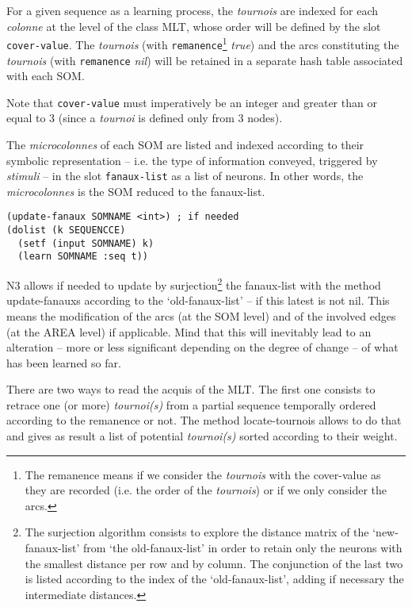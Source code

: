 For a given sequence as a learning process, the \textit{tournois} are indexed for each \textit{colonne} at the level of the class MLT, whose order will be defined by the slot \texttt{cover-value}. The \textit{tournois} (with \texttt{remanence}\footnote{The remanence means if we consider the \textit{tournois} with the cover-value as they are recorded (i.e. the order of the \textit{tournois}) or if we only consider the arcs.} \textit{true}) and the arcs constituting the \textit{tournois} (with \texttt{remanence} \textit{nil}) will be retained in a separate hash table associated with each SOM.

Note that \texttt{cover-value} must imperatively be an integer and greater than or equal to 3 (since a \textit{tournoi} is defined only from 3 nodes).

\bigskip

The \textit{microcolonnes} of each SOM are listed and indexed according to their symbolic representation -- i.e. the type of information conveyed, triggered by \textit{stimuli} -- in the slot \texttt{fanaux-list} as a list of neurons. In other words, the 
\textit{microcolonnes} is the SOM reduced to the fanaux-list.
\bigskip

\begin{lstlisting}[language=N3]
(update-fanaux SOMNAME <int>) ; if needed
(dolist (k SEQUENCCE)
  (setf (input SOMNAME) k)
  (learn SOMNAME :seq t))
\end{lstlisting}

\bigskip

N3 allows if needed to update by surjection\footnote{The surjection algorithm consists to explore the distance matrix of the `new-fanaux-list' from `the old-fanaux-list' in order to retain only the neurons with the smallest distance per row and by column. The conjunction of the last two is listed according to the index of the `old-fanaux-list', adding if necessary the intermediate distances.\label{surj}} the fanaux-list with the method \glspl{update-fanaux} according to the `old-fanaux-list' -- if this latest is not nil. This means the modification of the arcs (at the SOM level) and of the involved edges (at the AREA level) if applicable. Mind that this will inevitably lead to an alteration -- more or less significant depending on the degree of change -- of what has been learned so far.

\bigskip
There are two ways to read the acquis of the MLT. The first one consists to retrace one (or more) \textit{tournoi(s)} from a partial sequence temporally ordered according to the remanence or not. The method \glspl{locate-tournoi} allows to do that and gives as result a list of potential \textit{tournoi(s)} sorted according to their weight. 

